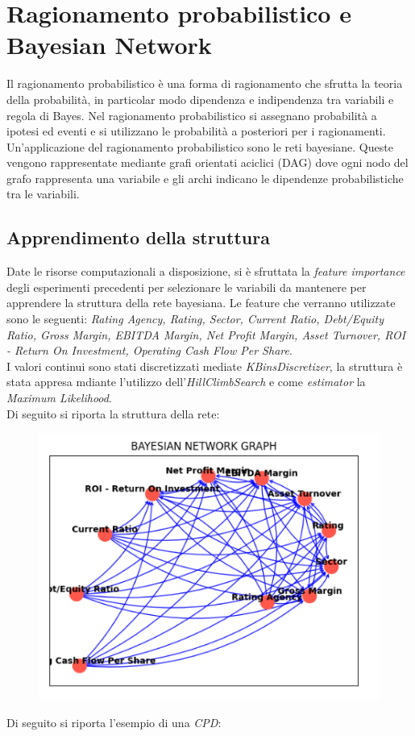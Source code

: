 \section{Ragionamento probabilistico e Bayesian Network}

\noindent Il ragionamento probabilistico è una forma di ragionamento che sfrutta la teoria della
probabilità, in particolar modo dipendenza e indipendenza tra variabili e regola di
Bayes. Nel ragionamento probabilistico si assegnano probabilità a ipotesi ed eventi e
si utilizzano le probabilità a posteriori per i ragionamenti. Un’applicazione del
ragionamento probabilistico sono le reti bayesiane. Queste vengono rappresentate
mediante grafi orientati aciclici (DAG) dove ogni nodo del grafo rappresenta una
variabile e gli archi indicano le dipendenze probabilistiche tra le variabili.

\subsection{Apprendimento della struttura}
\noindent Date le risorse computazionali a disposizione, si è sfruttata la \textit{feature importance} degli esperimenti precedenti per selezionare le variabili da mantenere per apprendere la struttura della rete bayesiana.
Le feature che verranno utilizzate sono le seguenti: \textit{Rating Agency, Rating, Sector, Current Ratio, Debt/Equity Ratio, Gross Margin, EBITDA Margin, Net Profit Margin, Asset Turnover, ROI - Return On Investment, Operating Cash Flow Per Share}.
\\ I valori continui sono stati discretizzati mediate \textit{KBinsDiscretizer}, la struttura è stata appresa mdiante l'utilizzo dell'\textit{HillClimbSearch} e come \textit{estimator} la \textit{Maximum Likelihood}. 
\\ Di seguito si riporta la struttura della rete:
\begin{figure}[H]
    \centering
    \includegraphics[scale=0.8]{img/bn.png}
\end{figure}
\noindent Di seguito si riporta l'esempio di una \textit{CPD}:

